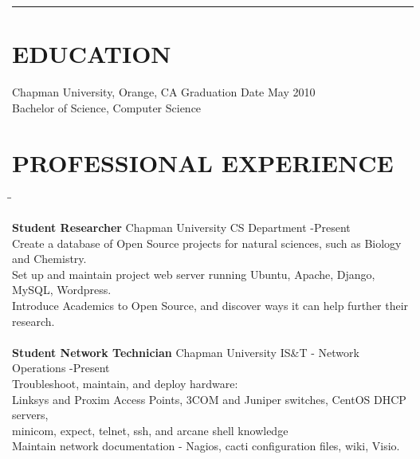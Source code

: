 \documentclass{res}
\begin{document}
 

\address{5205 E. Rolling Hill Drive\\Anaheim, CA 92807}
\address{\hspace{28pt}yasumoto7@gmail.com\\smith237@mail.chapman.edu}

\begin{resume}
\rule{\textwidth}{1pt}

   \vspace{-0.1in}	
\section{EDUCATION}          
	 Chapman University, Orange, CA \hspace{2.9in} Graduation Date May 2010\\
	 Bachelor of Science, Computer Science \\

   \vspace{-0.3in}	
\section{PROFESSIONAL EXPERIENCE}
   \vspace{-5pt}
   \begin{tabbing}
   \hspace{2.5in}\= \hspace{3.45in}\= \kill %

    {\bf Student Researcher} \>\hspace{0.3in}Chapman University CS Department     -Present\\
	 Create a database of Open Source projects for natural sciences, such as Biology and Chemistry. \\
	 Set up and maintain project web server running Ubuntu, Apache, Django, MySQL, Wordpress.\\
	 Introduce Academics to Open Source, and discover ways it can help further their research.\\

\\

    {\bf Student Network Technician} \>\hspace{0.01}Chapman University IS\&T - Network Operations -Present\\
	 Troubleshoot, maintain, and deploy hardware: \\
	 \hspace{0.3in}Linksys and Proxim Access Points, 3COM and Juniper switches, CentOS DHCP servers,\\
	 \hspace{0.3in}minicom, expect, telnet, ssh, and arcane shell knowledge\\
	 Maintain network documentation - Nagios, cacti configuration files, wiki, Visio.\\


\end{tabbing}
\end{resume}
\end{document}
